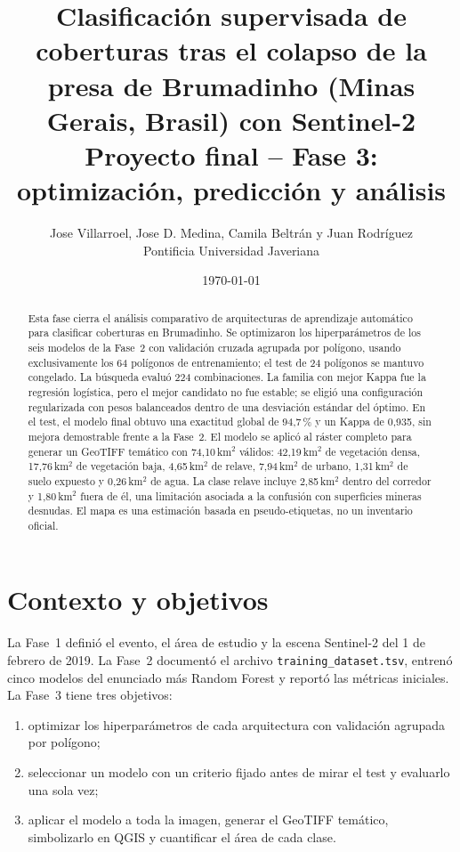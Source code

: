 \documentclass{article}
\title{Clasificación supervisada de coberturas tras el colapso de la presa de Brumadinho (Minas Gerais, Brasil) con Sentinel-2\\[0.5em]
\large Proyecto final -- Fase 3: optimización, predicción y análisis}
\author{Jose Villarroel, Jose D. Medina, Camila Beltrán y Juan Rodríguez\\Pontificia Universidad Javeriana}
\date{\today}
\begin{document}
\maketitle

\begin{abstract}
Esta fase cierra el análisis comparativo de arquitecturas de aprendizaje automático para clasificar coberturas en Brumadinho. Se optimizaron los hiperparámetros de los seis modelos de la Fase~2 con validación cruzada agrupada por polígono, usando exclusivamente los 64 polígonos de entrenamiento; el test de 24 polígonos se mantuvo congelado. La búsqueda evaluó 224 combinaciones. La familia con mejor Kappa fue la regresión logística, pero el mejor candidato no fue estable; se eligió una configuración regularizada con pesos balanceados dentro de una desviación estándar del óptimo. En el test, el modelo final obtuvo una exactitud global de 94{,}7\,\% y un Kappa de 0{,}935, sin mejora demostrable frente a la Fase~2. El modelo se aplicó al ráster completo para generar un GeoTIFF temático con 74{,}10\,km$^2$ válidos: 42{,}19\,km$^2$ de vegetación densa, 17{,}76\,km$^2$ de vegetación baja, 4{,}65\,km$^2$ de relave, 7{,}94\,km$^2$ de urbano, 1{,}31\,km$^2$ de suelo expuesto y 0{,}26\,km$^2$ de agua. La clase relave incluye 2{,}85\,km$^2$ dentro del corredor y 1{,}80\,km$^2$ fuera de él, una limitación asociada a la confusión con superficies mineras desnudas. El mapa es una estimación basada en pseudo-etiquetas, no un inventario oficial.
\end{abstract}

\section{Contexto y objetivos}

La Fase~1 definió el evento, el área de estudio y la escena Sentinel-2 del 1 de febrero de 2019. La Fase~2 documentó el archivo \texttt{training\_dataset.tsv}, entrenó cinco modelos del enunciado más Random Forest y reportó las métricas iniciales. La Fase~3 tiene tres objetivos:

\begin{enumerate}
 \item optimizar los hiperparámetros de cada arquitectura con validación agrupada por polígono;
 \item seleccionar un modelo con un criterio fijado antes de mirar el test y evaluarlo una sola vez;
 \item aplicar el modelo a toda la imagen, generar el GeoTIFF temático, simbolizarlo en QGIS y cuantificar el área de cada clase.
\end{enumerate}
\end{document}
